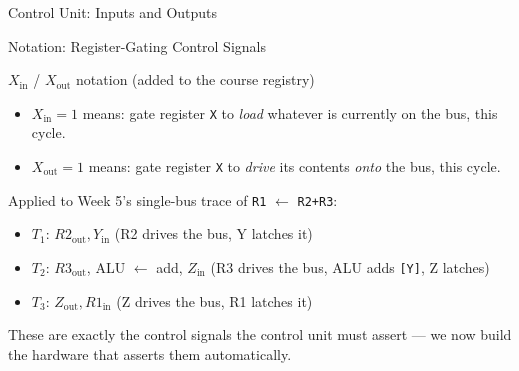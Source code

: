 \documentclass[aspectratio=169]{beamer}
\begin{document}
\begin{frame}{Control Unit: Inputs and Outputs}
\begin{center}
  \end{center}
  \cite{Hamacher2002_computer_organization}
\end{frame}

\begin{frame}{Notation: Register-Gating Control Signals}
  \begin{block}{$X_{\text{in}}$ / $X_{\text{out}}$ notation (added to the course registry)}
    \begin{itemize}
      \item $X_{\text{in}} = 1$ \quad means: gate register \texttt{X} to \emph{load} whatever
        is currently on the bus, this cycle.
      \item $X_{\text{out}} = 1$ \quad means: gate register \texttt{X} to \emph{drive} its
        contents \emph{onto} the bus, this cycle.
    \end{itemize}
  \end{block}
  Applied to Week 5's single-bus trace of \texttt{R1} $\gets$ \texttt{R2+R3}:
  \begin{itemize}
    \item $T_1$: $R2_{\text{out}}, Y_{\text{in}}$ \quad (R2 drives the bus, Y latches it)
    \item $T_2$: $R3_{\text{out}}$, ALU $\gets$ add, $Z_{\text{in}}$ \quad
      (R3 drives the bus, ALU adds \texttt{[Y]}, Z latches)
    \item $T_3$: $Z_{\text{out}}, R1_{\text{in}}$ \quad (Z drives the bus, R1 latches it)
  \end{itemize}
  These are exactly the control signals the control unit must assert --- we now
  build the hardware that asserts them automatically.
\end{frame}
\end{document}

